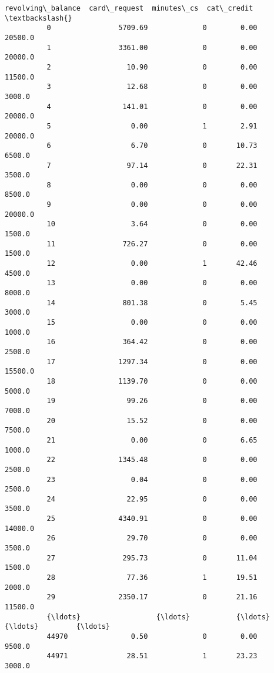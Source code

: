 \documentclass[11pt]{article}
\begin{document}
\begin{Verbatim}[commandchars=\\\{\}]
                 revolving\_balance  card\_request  minutes\_cs  cat\_credit  \textbackslash{}
          0                5709.69             0        0.00     20500.0   
          1                3361.00             0        0.00     20000.0   
          2                  10.90             0        0.00     11500.0   
          3                  12.68             0        0.00      3000.0   
          4                 141.01             0        0.00     20000.0   
          5                   0.00             1        2.91     20000.0   
          6                   6.70             0       10.73      6500.0   
          7                  97.14             0       22.31      3500.0   
          8                   0.00             0        0.00      8500.0   
          9                   0.00             0        0.00     20000.0   
          10                  3.64             0        0.00      1500.0   
          11                726.27             0        0.00      1500.0   
          12                  0.00             1       42.46      4500.0   
          13                  0.00             0        0.00      8000.0   
          14                801.38             0        5.45      3000.0   
          15                  0.00             0        0.00      1000.0   
          16                364.42             0        0.00      2500.0   
          17               1297.34             0        0.00     15500.0   
          18               1139.70             0        0.00      5000.0   
          19                 99.26             0        0.00      7000.0   
          20                 15.52             0        0.00      7500.0   
          21                  0.00             0        6.65      1000.0   
          22               1345.48             0        0.00      2500.0   
          23                  0.04             0        0.00      2500.0   
          24                 22.95             0        0.00      3500.0   
          25               4340.91             0        0.00     14000.0   
          26                 29.70             0        0.00      3500.0   
          27                295.73             0       11.04      1500.0   
          28                 77.36             1       19.51      2000.0   
          29               2350.17             0       21.16     11500.0   
          {\ldots}                  {\ldots}           {\ldots}         {\ldots}         {\ldots}   
          44970               0.50             0        0.00      9500.0   
          44971              28.51             1       23.23      3000.0   

\end{Verbatim}
\end{document}

